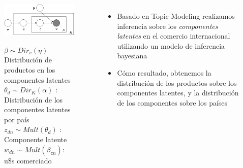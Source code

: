 \documentclass[compress]{beamer}
\begin{document}
\begin{frame}

\begin{columns}[c] 
	
	\begin{figure}
		\includegraphics[width=\linewidth]{grafo}
		
		\medskip
		\tiny
		$\beta \sim Dir_v(\eta)$  Distribución de productos en los componentes latentes\\
		$\theta_d \sim Dir_K(\alpha)$ : Distribución de los componentes latentes por país\\
		$z_{dn} \sim Mult(\theta_d)$ : Componente latente \\
		$w_{dn} \sim Mult(\beta_{zn})$: u\$s comerciado
		
	\end{figure}
	
	\small
	
	\begin{itemize}
		
		\item[\faRebel] Basado en Topic Modeling  \citep{blei2003latent} realizamos inferencia sobre los \textit{componentes latentes} en el comercio internacional utilizando un modelo de inferencia bayesiana
		\item[\faRebel] Cómo resultado, obtenemos la distribución de los productos sobre los componentes latentes, y la distribución de los componentes sobre los países
	\end{itemize}
	
\end{columns}
\end{frame}
\end{document}
